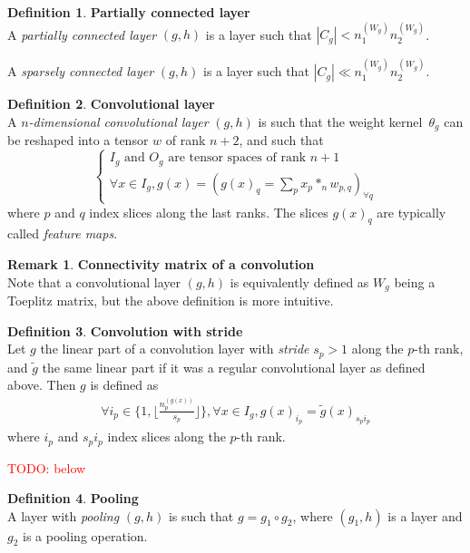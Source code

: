 \documentclass{article}
\theoremstyle{definition}
\newtheorem{definition}{Definition}[section]
\newtheorem{remark}{Remark}
\newcommand{\todo}[1]{\textcolor{red}{TODO: #1\\}}
\begin{document}
\begin{definition}\textbf{Partially connected layer}\\
A \textit{partially connected layer} $(g,h)$ is a layer such that $|C_g| < n_1^{(W_g)} n_2^{(W_g)}$.

A \textit{sparsely connected layer} $(g,h)$ is a layer such that $|C_g| \ll n_1^{(W_g)} n_2^{(W_g)}$.
\end{definition}

\begin{definition}\textbf{Convolutional layer}\\
A \textit{$n$-dimensional convolutional layer} $(g,h)$ is such that the weight kernel~$\theta_g$ can be reshaped into a tensor $w$ of rank $n+2$, and such that
$$
\left\{
\begin{array}{l}
  I_g \mbox{ and } O_g \mbox{ are tensor spaces of rank }n+1 \\
  \forall x \in I_g, g(x) = (g(x)_q = \sum\limits_p{x_p \ast_n w_{p,q}})_{\forall q}
\end{array}
\right.
$$
where $p$ and $q$ index slices along the last ranks. The slices $g(x)_q$ are typically called \textit{feature maps}.
\end{definition}


\begin{remark}\textbf{Connectivity matrix of a convolution}\\
Note that a convolutional layer $(g,h)$ is equivalently defined as $W_g$ being a Toeplitz matrix, but the above definition is more intuitive.
\end{remark}

\begin{definition}\textbf{Convolution with stride}\\
Let $g$ the linear part of a convolution layer with \emph{stride} $s_p > 1$ along the $p$-th rank, and $\widetilde{g}$ the same linear part if it was a regular convolutional layer as defined above. Then $g$ is defined as
\begin{gather*}
  \forall i_p \in \{ 1, \lfloor \frac{n_p^{(g(x))}}{s_p} \rfloor \}, \forall x \in I_g, g(x)_{i_p} = \widetilde{g}(x)_{s_p i_p}
\end{gather*}
where $i_p$ and $s_p i_p$ index slices along the $p$-th rank.
\end{definition}

\todo{below}

\begin{definition}\textbf{Pooling}\\
A layer with \textit{pooling} $(g,h)$ is such that $g = g_1 \circ g_2$, where $(g_1,h)$ is a layer and $g_2$ is a pooling operation.
\end{definition}
\end{document}
